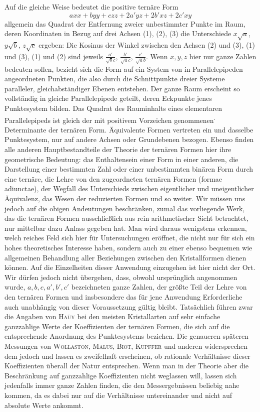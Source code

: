 Auf die gleiche Weise bedeutet die positive ternäre Form
\[
axx+byy+czz+2a'yz+2b'xz+2c'xy
\]
allgemein das Quadrat der Entfernung zweier unbestimmter Punkte im Raum, deren Koordinaten in Bezug auf drei Achsen (1), (2), (3) die Unterschiede $x\surd a$, $y\surd b$, $z\surd c$
ergeben: Die Kosinus der Winkel zwischen den Achsen (2) und (3), (1) und (3), (1) und (2) sind jeweils $\frac{a'}{\surd bc}$, $\frac{b'}{\surd ac}$, $\frac{c'}{\surd ab}$. Wenn $x,y,z$ hier nur ganze Zahlen bedeuten sollen, bezieht sich die Form auf ein System von in Parallelepipeden angeordneten Punkten, die also durch die Schnittpunkte dreier Systeme paralleler, gleichabständiger Ebenen entstehen. Der ganze Raum erscheint so vollständig in gleiche Parallelepipede geteilt, deren Eckpunkte jenes Punktesystem bilden. Das Quadrat des Rauminhalts eines elementaren Parallelepipeds ist gleich der mit positivem Vorzeichen genommenen\textsuperscript{.} Determinante der ternären Form. Äquivalente Formen vertreten ein und dasselbe Punktesystem, nur auf andere Achsen oder Grundebenen bezogen. Ebenso finden alle anderen Hauptbestandteile der Theorie der ternären Formen hier ihre geometrische Bedeutung: das Enthaltensein einer Form in einer anderen, die Darstellung einer bestimmten Zahl oder einer unbestimmten binären Form durch eine ternäre, die Lehre von den zugeordneten ternären Formen (formae adiunctae), der Wegfall des Unterschieds zwischen eigentlicher und uneigentlicher Äquivalenz, das Wesen der reduzierten Formen und so weiter. Wir müssen uns jedoch auf die obigen Andeutungen beschränken, zumal das vorliegende Werk, das die ternären Formen ausschließlich aus rein arithmetischer Sicht betrachtet, nur mittelbar dazu Anlass gegeben hat. Man wird daraus wenigstens erkennen, welch reiches Feld sich hier für Untersuchungen eröffnet, die nicht nur für sich ein hohes theoretisches Interesse haben, sondern auch zu einer ebenso bequemen wie allgemeinen Behandlung aller Beziehungen zwischen den Kristallformen dienen können. Auf die Einzelheiten dieser Anwendung einzugehen ist hier nicht der Ort. Wir dürfen jedoch nicht übergehen, dass, obwohl ursprünglich angenommen wurde, $a,b,c,a',b',c'$ bezeichneten ganze Zahlen, der größte Teil der Lehre von den ternären Formen und insbesondere das für jene Anwendung Erforderliche auch unabhängig von dieser Voraussetzung gültig bleibt. Tatsächlich führen zwar die Angaben von \textsc{Haüy} bei den meisten Kristallarten auf sehr einfache ganzzahlige Werte der Koeffizienten der ternären Formen, die sich auf die entsprechende Anordnung des Punktesystems beziehen. Die genaueren späteren Messungen von \textsc{Wollaston}, \textsc{Malus}, \textsc{Biot}, \textsc{Kupffer} und anderen widersprechen dem jedoch und lassen es zweifelhaft erscheinen, ob rationale Verhältnisse dieser Koeffizienten überall der Natur entsprechen. Wenn man in der Theorie aber die
Beschränkung auf ganzzahlige Koeffizienten nicht weglassen will, lassen sich jedenfalls immer ganze Zahlen finden, die den Messergebnissen beliebig nahe kommen, da es dabei nur auf die Verhältnisse untereinander und nicht auf absolute Werte ankommt.

